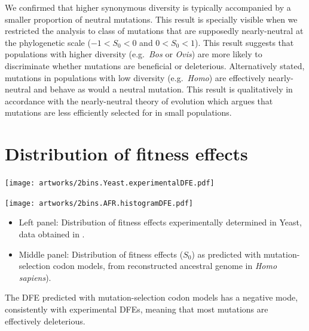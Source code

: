 \documentclass{article}
\newcommand{\Sphy}{S_{0}}
\newcommand{\divWeakDel}{-1 < \Sphy < 0}
\newcommand{\divWeakAdv}{0 < \Sphy < 1}
\begin{document}
    We confirmed that higher synonymous diversity is typically accompanied by a smaller proportion of neutral mutations.
    This result is specially visible when we restricted the analysis to class of mutations that are supposedly nearly-neutral at the phylogenetic scale ($\divWeakDel$ and $\divWeakAdv$).
    This result suggests that populations with higher diversity (e.g.~\textit{Bos} or \textit{Ovis}) are more likely to discriminate whether mutations are beneficial or deleterious.
    Alternatively stated, mutations in populations with low diversity (e.g.~\textit{Homo}) are effectively nearly-neutral and behave as would a neutral mutation.
    This result is qualitatively in accordance with the nearly-neutral theory of evolution which argues that mutations are less efficiently selected for in small populations.


    \section{Distribution of fitness effects}

    \begin{minipage}{0.49\linewidth}
        \texttt{[image: artworks/2bins.Yeast.experimentalDFE.pdf]}
    \end{minipage}
    \begin{minipage}{0.49\linewidth}
        \texttt{[image: artworks/2bins.AFR.histogramDFE.pdf]}
    \end{minipage}
    \begin{itemize}
        \item Left panel: Distribution of fitness effects experimentally determined in Yeast, data obtained in \textcite{shen_synonymous_2022}.
        \item Middle panel: Distribution of fitness effects ($\Sphy$) as predicted with mutation-selection codon models, from reconstructed ancestral genome in \textit{Homo sapiens}).
    \end{itemize}
    The DFE predicted with mutation-selection codon models has a negative mode, consistently with experimental DFEs, meaning that most mutations are effectively deleterious.

    \newpage
\end{document}
